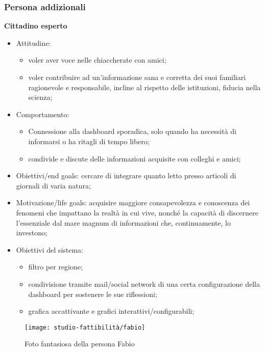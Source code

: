 \subsubsection*{Persona addizionali}
\textbf{Cittadino esperto}
	\begin{itemize}
	\item Attitudine:
    \begin{itemize}
        \item voler aver voce nelle chiaccherate con amici;
        \item voler contribuire ad un'informazione sana e corretta dei suoi familiari 
        ragionevole e responsabile, incline al rispetto delle istituzioni, fiducia nella scienza;
    \end{itemize}
	\item Comportamento: 
    \begin{itemize}
        \item Connessione alla dashboard sporadica, solo quando ha necessità di informarsi o ha ritagli di tempo libero;
        \item condivide e discute delle informazioni acquisite con colleghi e amici;
    \end{itemize}
    \item Obiettivi/end goals: cercare di integrare quanto letto presso articoli di giornali di varia natura;
    \item Motivazione/life goals: acquisire maggiore consapevolezza e conoscenza dei fenomeni che impattano la realtà in cui vive, nonché la capacità di discernere l'essenziale dal mare magnum di informazioni che, continuamente, lo investono;
    \item Obiettivi del sistema:
    \begin{itemize}
        \item filtro per regione;
        \item condivisione tramite mail/social network di una certa configurazione della dashboard per sostenere le sue riflessioni;
        \item grafica accattivante e grafici interattivi/configurabili;
    \end{itemize}
\end{itemize}

\begin{wrapfigure}{r}{8cm}
    \texttt{[image: studio-fattibilità/fabio]}
    \caption{Foto fantasiosa della persona Fabio}
\end{wrapfigure}

